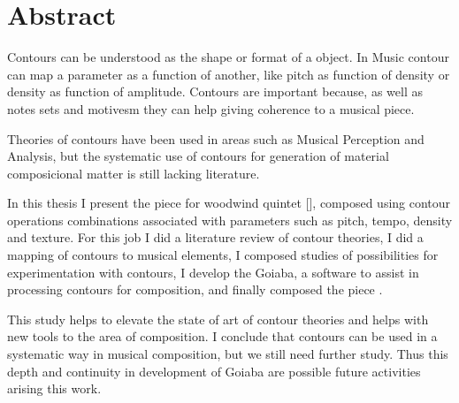 \chapter*{Abstract}
\label{cha:abstract}

Contours can be understood as the shape or format of a object. In
Music contour can map a parameter as a function of another, like pitch
as function of density or density as function of amplitude. Contours
are important because, as well as notes sets and motivesm they can
help giving coherence to a musical piece.

Theories of contours have been used in areas such as Musical
Perception and Analysis, but the systematic use of contours for
generation of material composicional matter is still lacking
literature.

In this thesis I present the piece for woodwind quintet \obra{}
[], composed using contour operations
combinations associated with parameters such as pitch, tempo, density
and texture. For this job I did a literature review of contour
theories, I did a mapping of contours to musical elements, I composed
studies of possibilities for experimentation with contours, I develop
the Goiaba, a software to assist in processing contours for
composition, and finally composed the piece \obra{}.

This study helps to elevate the state of art of contour theories and
helps with new tools to the area of composition.
I conclude that contours can be used in a systematic way in musical
composition, but we still need further study. Thus this depth and
continuity in development of Goiaba are possible future activities
arising this work.
